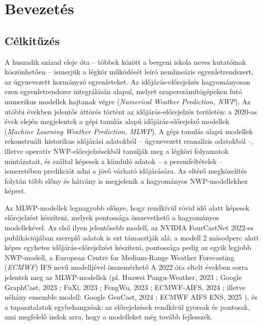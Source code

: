 \documentclass[12pt,a4paper]{article}
\begin{document}
\begin{abstract}
    Az alkalmazott lagrange-i megközelítés alapján tehát az AIFS is mutat kaotikus tulajdonságokat, ami azt jelenti, hogy a modell nem veszíti el teljesen a tanulás során a légkör ezen tulajdonságának reprezentálását, de az elmosódás hatása megfigyelhető.
\end{abstract}
\newpage

\section{Bevezetés}

\subsection{Célkitűzés}
A huszadik század eleje óta -- többek között a bergeni iskola neves kutatóinak köszönhetően -- ismerjük a légkör működését leíró nemlineáris egyenletrendszert, az úgynevezett kormányzó egyenleteket. Az időjárás-előrejelzés hagyományosan ezen egyenletrendszer integrálásán alapul, melyet szuperszámítógépeken futó numerikus modellek hajtanak végre (\textit{Numerical Weather Prediction, NWP}). Az utóbbi években jelentős áttörés történt az időjárás-előrejelzés területén: a 2020-as évek elején megjelentek a gépi tanulás alapú időjárás-előrejelző modellek (\textit{Machine Learning Weather Prediction, MLWP}). A gépi tanulás alapú modellek rekonstruált historikus időjárási adatokból -- úgynevezett reanalízis adatokból --, illetve operatív NWP-előrejelzésekből tanulják meg a légköri folyamatok mintázatait, és ezáltal képesek a kiinduló adatok -- a peremfeltételek -- ismeretében predikciót adni a jövő várható időjárására. Az eltérő megközelítés folytán több előny és hátrány is megjelenik a hagyományos NWP-modellekhez képest.

Az MLWP-modellek legnagyobb előnye, hogy rendkívül rövid idő alatt képesek előrejelzést készíteni, melyek pontossága összevethető a hagyományos modellekével. Az első ilyen jelentősebb modell, az NVIDIA FourCastNet 2022-es publikációjában szereplő adatok is ezt támasztják alá: a modell 2 másodperc alatt képes egyhetes időjárás-előrejelzést készíteni, pontossága pedig az egyik legjobb NWP-modell, a European Centre for Medium-Range Weather Forecasting (\textit{ECMWF}) IFS nevű modelljével összemérhető \cite{pathak_fourcastnet_2022} A 2022 óta eltelt években sorra jelentek meg az MLWP-modellek (pl. Huawei Pangu-Weather, 2023 \cite{bi_accurate_2023}; Google GraphCast, 2023 \cite{lam_graphcast_2023}; FuXi, 2023 \cite{chen_fuxi_2023}; FengWu, 2023 \cite{chen_fengwu_2023}; ECMWF-AIFS, 2024 \cite{lang_aifs_2024}; illetve néhány ensemble modell: Google GenCast, 2024 \cite{price_gencast_2024}; ECMWF AIFS ENS, 2025 \cite{noauthor_aifs_2025}), és a tapasztalatok egybehangzóak: az előrejelzések rendkívül gyorsak és pontosak, ami megfelelő indok arra, hogy a modelleket még tovább fejlesszék.
\end{document}
